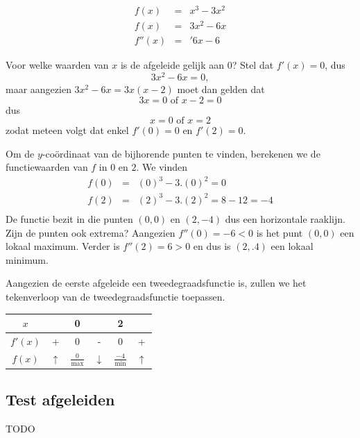 \begin{voorbeeld}
	\begin{eqnarray*}
	f(x) & =& x^3-3x^2 \\
	f(x) & =& 3x^2-6x \\
	f''(x) & =& '6x-6 
	\end{eqnarray*}

%


	Voor welke waarden van $x$ is de afgeleide gelijk aan 0? Stel dat $f'(x)=0$, dus
	\begin{equation*}
	3x^2-6x=0,
	\end{equation*}
	maar aangezien $3x^2-6x=3x(x-2)$ moet dan gelden dat
	\begin{equation*}
	3x =0 \text{ of } x-2=0
	\end{equation*}
	dus
	\begin{equation*}
	x=0 \text{ of } x=2
	\end{equation*}
	zodat meteen volgt dat enkel $f'(0)=0$ en $f'(2)=0$.
	
	Om de $y$-co\"ordinaat van de bijhorende punten te vinden, berekenen we de functiewaarden van $f$ in $0$ en $2$. We vinden
	\begin{eqnarray*}
		f(0)&=&(0)^3-3.(0)^2= 0 \\
		f(2)&=&(2)^3-3.(2)^2= 8-12=-4 \\
	\end{eqnarray*}
	De functie bezit in die punten $(0,0)$ en $(2,-4)$ dus een horizontale raaklijn. Zijn de punten ook extrema? 
	Aangezien $f''(0)=-6<0$ is het punt $(0,0)$ een lokaal maximum. Verder is $f''(2)=6>0$ en dus is $(2,.4)$ een lokaal minimum.
	
	Aangezien de eerste afgeleide een tweedegraadsfunctie is, zullen we het tekenverloop van de tweedegraadsfunctie toepassen.
	
	\begin{center}
		\begin{tabular}{c|ccccc}
			$x$ & & 0 & & 2 & \\
			\hline 
			$f'(x)$ & + & 0 & - & 0 & + \\
			\hline
			$f(x)$ & $\uparrow$  & $\frac{0}{\text{max}}$ & $\downarrow$ & $\frac{-4}{\text{min}}$ & $\uparrow$
		\end{tabular}
	\end{center}


\end{voorbeeld}

\subsection{Test afgeleiden}
TODO





